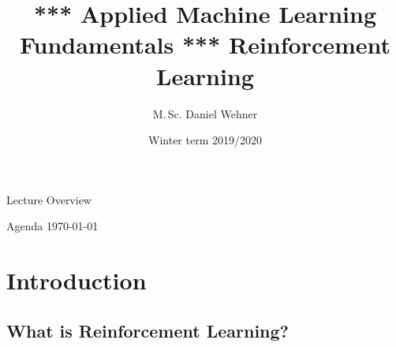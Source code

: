 


\title[Reinforcement Learning]{*** Applied Machine Learning Fundamentals *** Reinforcement Learning}
\author{M.\,Sc. Daniel Wehner}
\date{Winter term 2019/2020}




\maketitlepage


\begin{frame}{Lecture Overview}{}
	\begin{center}
		\Huge{}
	\end{center}
\end{frame}


\begin{frame}{Agenda \today}
	\begin{multicols}{2}
		\tableofcontents
	\end{multicols}
\end{frame}


\section{Introduction}

\subsection{What is Reinforcement Learning?}

